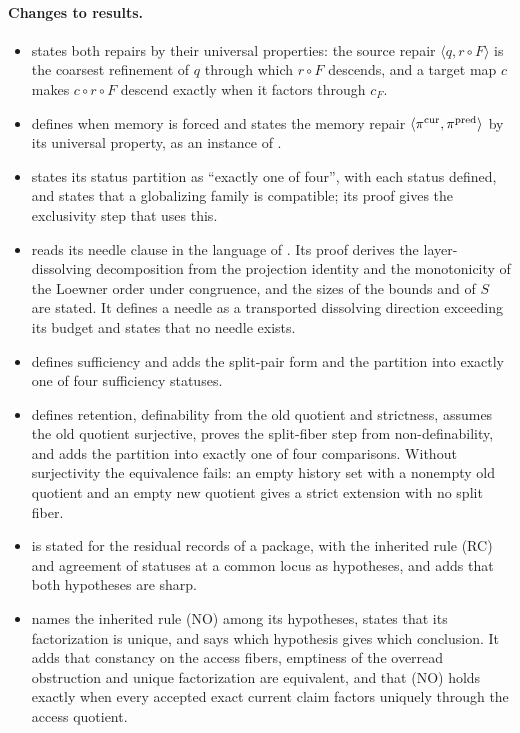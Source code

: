 \paragraph{Changes to results.}
\begin{itemize}
\item {} states both repairs by their universal properties: the
  source repair \(\langle q,r\circ F\rangle\) is the coarsest refinement of
  \(q\) through which \(r\circ F\) descends, and a target map \(c\) makes
  \(c\circ r\circ F\) descend exactly when it factors through \(c_F\).
\item {} defines when memory is forced and states the memory
  repair \(\langle\pi^{\mathrm{cur}},\pi^{\mathrm{pred}}\rangle\) by its universal property, as an
  instance of .
\item {} states its status partition as ``exactly one of four'',
  with each status defined, and states that a globalizing family is
  compatible; its proof gives the exclusivity step that uses this.
\item {} reads its needle clause in the language of
  . Its proof derives the layer-dissolving decomposition from the projection identity and the monotonicity of the Loewner order under congruence, and the sizes of the bounds and of \(S\) are stated. It defines a needle as a transported dissolving direction exceeding its budget and states that no needle exists.
\item {} defines sufficiency and adds the split-pair form and the
  partition into exactly one of four sufficiency statuses.
\item {} defines retention, definability from the old quotient and
  strictness, assumes the old quotient surjective, proves the split-fiber step
  from non-definability, and adds the partition into exactly one of four
  comparisons. Without surjectivity the equivalence fails: an empty history
  set with a nonempty old quotient and an empty new quotient gives a strict
  extension with no split fiber.
\item {} is stated for the residual records of a package, with the
  inherited rule (RC) and agreement of statuses at a common locus as
  hypotheses, and adds that both hypotheses are sharp.
\item {} names the inherited rule (NO) among its hypotheses,
  states that its factorization is unique, and says which hypothesis gives
  which conclusion. It adds that constancy on the access fibers, emptiness of the overread obstruction and unique factorization are equivalent, and that (NO) holds exactly when every accepted exact current claim factors uniquely through the access quotient.

\end{itemize}
